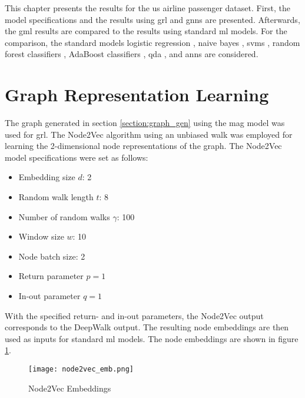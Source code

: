   
  This chapter presents the results for the \acs{us} airline passenger dataset. 
  First, the model specifications and the results using \acs{grl} and \acsp{gnn} 
  are presented. Afterwards, the \acs{gml} results are compared to the results 
  using standard \acs{ml} models. For the comparison, the standard models 
  logistic regression \citep{cramer2002origins}, naive bayes 
  \citep{zhang2004bayes}, \acsp{svm} \citep{platt1999probabilistic,chang2011libsvm}, 
  random forest classifiers \citep{breiman2001random}, AdaBoost classifiers 
  \citep{freund1997decision,hastie2009multi}, \acs{qda}
  \citep{tharwat2016linear}, and \acsp{ann}
  \citep{mcculloch1943logical,werbos1974beyond} are considered.

  \section{Graph Representation Learning}
  \label{section:result_n2v}

  The graph generated in section \ref{section:graph_gen} using the \acs{mag}
  model was used for \acs{grl}. The Node2Vec algorithm using an unbiased walk 
  was employed for learning the 2-dimensional node representations 
  of the graph. The Node2Vec model specifications were set as follows:

  \begin{itemize}
    \setlength\itemsep{0.1em}
    \item Embedding size $d$: 2
    \item Random walk length $t$: 8
    \item Number of random walks $\gamma$: 100
    \item Window size $w$: 10
    \item Node batch size: 2
    \item Return parameter $p=1$
    \item In-out parameter $q=1$
  \end{itemize}

  \noindent With the specified return- and in-out parameters, the Node2Vec
  output corresponds to the DeepWalk output. The resulting node embeddings are
  then used as inputs for standard \acs{ml} models. The node embeddings are 
  shown in figure \ref{fig:node2vec}. 

  \begin{figure}[h]
		\centering
		\texttt{[image: node2vec\_emb.png]}
		\caption{Node2Vec Embeddings}
        \label{fig:node2vec}
  \end{figure}

